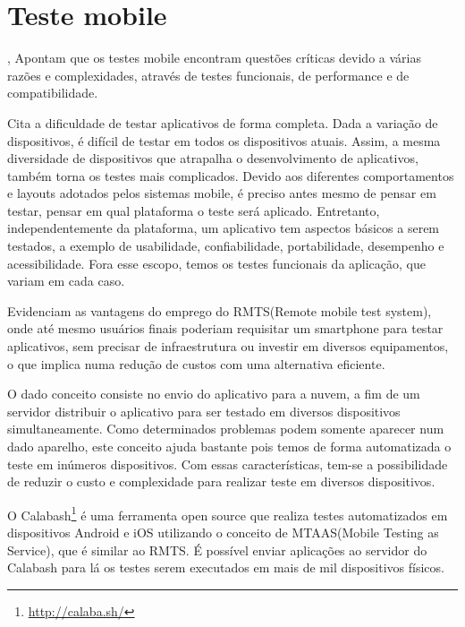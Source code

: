 \section{Teste mobile}\label{sec:mobile_testing}


\cite{Prathibhan-2014}, Apontam que os testes mobile encontram questões críticas devido a várias razões e complexidades, através de testes funcionais, de performance e de compatibilidade.


\cite{6248786} Cita a dificuldade de testar aplicativos de forma completa. Dada a variação de dispositivos, é difícil de testar em todos os dispositivos atuais. Assim, a mesma  diversidade de dispositivos que atrapalha o desenvolvimento de aplicativos, também torna os testes mais complicados. Devido aos diferentes comportamentos e layouts adotados pelos sistemas mobile, é preciso antes mesmo de pensar em testar, pensar em qual plataforma o teste será aplicado. Entretanto, independentemente da plataforma, um aplicativo tem aspectos básicos a serem testados, a exemplo de usabilidade, confiabilidade, portabilidade, desempenho e acessibilidade. Fora esse escopo, temos os testes funcionais da aplicação, que variam em cada caso.


\cite{Huang-2012} Evidenciam as vantagens do emprego do RMTS(Remote mobile test system), onde até mesmo usuários finais poderiam requisitar um smartphone para testar aplicativos, sem precisar de infraestrutura ou investir em diversos equipamentos, o que implica numa redução de custos com uma alternativa eficiente. 


O dado conceito consiste no envio do aplicativo para a nuvem, a fim de um servidor distribuir o aplicativo para ser testado em diversos dispositivos simultaneamente. Como determinados problemas podem somente aparecer num dado aparelho, este conceito ajuda bastante pois temos de forma automatizada o teste em inúmeros dispositivos. Com essas características, tem-se a possibilidade de reduzir o custo e complexidade para realizar teste em diversos dispositivos.


O Calabash\footnote{\url{http://calaba.sh/}} é uma ferramenta open source que realiza testes automatizados em dispositivos Android e iOS utilizando o conceito de MTAAS(Mobile Testing as Service), que é similar ao RMTS. É possível enviar aplicações ao servidor do Calabash para lá os testes serem executados em mais de mil dispositivos físicos.


